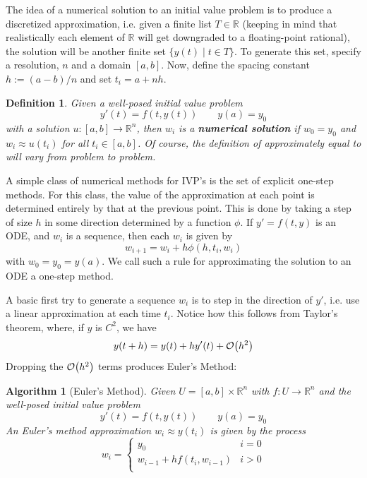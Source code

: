 \documentclass{article}
\newtheorem{definition}{Definition}[section]
\newtheorem{algorithm}{Algorithm}[section]
\newcommand{\R}{\mathbb{R}}
\newcommand{\0}{\vb{0}}
\begin{document}
The idea of a numerical solution to an initial value problem is to produce a discretized approximation, i.e. given a finite list $T \in \R$ (keeping in mind that realistically each element of $\R$ will get downgraded to a floating-point rational), the solution will be another finite set $\{y(t)\mid t\in T\}$. To generate this set, specify a resolution, $n$ and a domain $[a, b]$. Now, define the spacing constant $h := (a - b)/n$ and set $t_i = a + nh$.

\begin{definition}
  Given a well-posed initial value problem
  \[y'(t) = f(t, y(t)) \qquad y(a) = y_0\]
  with a solution $u:[a, b]\to\R^n$, then $w_i$ is a \textbf{numerical solution} if $w_0 = y_0$ and $w_i \approx u(t_i)$ for all $t_i\in[a, b]$. Of course, the definition of approximately equal to will vary from problem to problem.
\end{definition}

A simple class of numerical methods for IVP's is the set of explicit one-step methods. For this class, the value of the approximation at each point is determined entirely by that at the previous point. This is done by taking a step of size $h$ in some direction determined by a function $\phi$. If $y' = f(t, y)$ is an ODE, and $w_i$ is a sequence, then each $w_i$ is given by
\[w_{i+1} = w_i + h\phi(h, t_i, w_i)\]
with $w_0 = y_0 = y(a)$. We call such a rule for approximating the solution to an ODE a one-step method.

A basic first try to generate a sequence $w_i$ is to step in the direction of $y'$, i.e. use a linear approximation at each time $t_i$. Notice how this follows from Taylor's theorem, where, if $y$ is $C^2$, we have
\[y(t + h) = y(t) + hy'(t) + \order{h^2}\]
Dropping the $\order{h^2}$ terms produces Euler's Method:

\begin{algorithm}[Euler's Method]
  \label{euler}
  Given $U = [a, b] \times \R^n$ with $f: U\to\R^n$ and the well-posed initial value problem
  \[y'(t) = f(t, y(t)) \qquad y(a) = y_0\]
  An Euler's method approximation $w_i \approx y(t_i)$ is given by the process
  \[w_i = \begin{cases}
    y_0 & i = 0 \\
    w_{i-1} + hf(t_i, w_{i-1}) & i > 0 \\
  \end{cases}\]
\end{algorithm}
\end{document}
